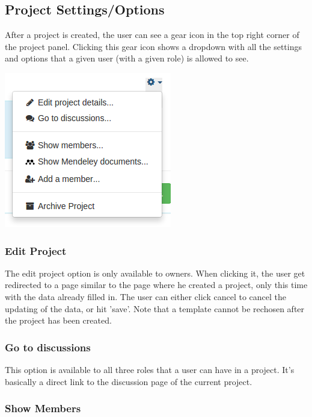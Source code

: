 \subsection{Project Settings/Options}

After a project is created, the user can see a gear icon in the top right corner of the project panel. Clicking this gear icon shows a dropdown
with all the settings and options that a given user (with a given role) is allowed to see.

\begin{center}
\includegraphics[scale=0.5]{./img/project_dropdown.png}
\end{center}

\subsubsection{Edit Project}

The edit project option is only available to owners. When clicking it, the user get redirected to a page similar to the page where he created a project,
only this time with the data already filled in. The user can either click cancel to cancel the updating of the data, or hit 'save'. Note
that a template cannot be rechosen after the project has been created.

\subsubsection{Go to discussions}

This option is available to all three roles that a user can have in a project. It's basically a direct link to the discussion page of the current
project.

\subsubsection{Show Members}

